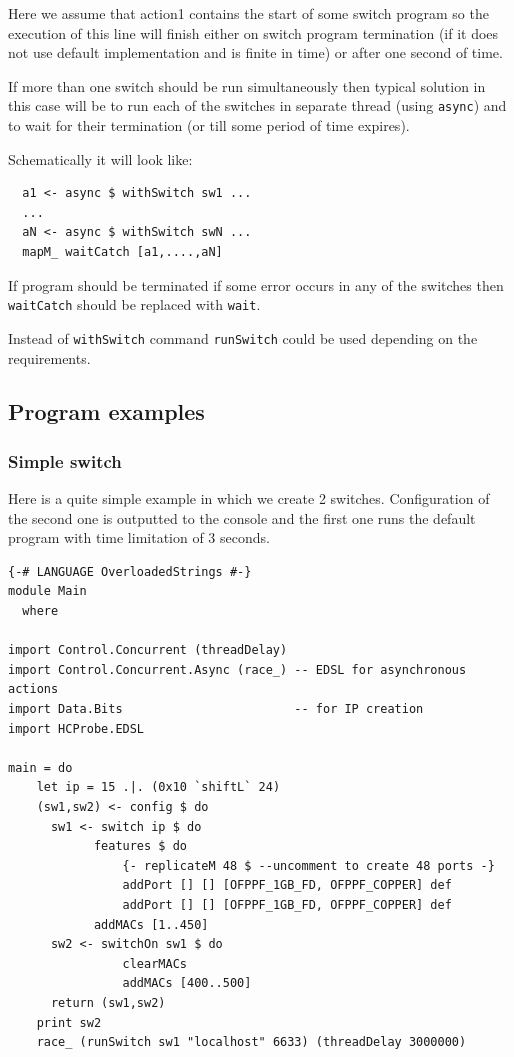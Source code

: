 \documentclass[9pt,a4paper]{article}
\begin{document}
Here we assume that action1 contains the start of some switch program so the
execution of this line will finish either on switch program
termination (if it does not use default implementation and is finite
in time) or after one second of time.

If more than one switch should be run simultaneously then typical
solution in this case will be to run each of the switches in separate
thread (using \lstinline!async!) and to wait for their termination (or
till some period of time expires).

Schematically it will look like:

\begin{lstlisting}
  a1 <- async $ withSwitch sw1 ...
  ...
  aN <- async $ withSwitch swN ...
  mapM_ waitCatch [a1,....,aN]
\end{lstlisting}

If program should be terminated if some error occurs in any of the
switches then \lstinline!waitCatch! should be replaced with
\lstinline!wait!.

Instead of \lstinline!withSwitch! command \lstinline!runSwitch! could
be used depending on the requirements.

\subsection{Program examples}

\subsubsection{Simple switch}

Here is a quite simple example in which we create 2
switches. Configuration of the second one is outputted to the console and
the first one runs the default program with time limitation of 3 seconds.

\begin{lstlisting}
{-# LANGUAGE OverloadedStrings #-}
module Main
  where

import Control.Concurrent (threadDelay)
import Control.Concurrent.Async (race_) -- EDSL for asynchronous actions
import Data.Bits                        -- for IP creation
import HCProbe.EDSL

main = do 
    let ip = 15 .|. (0x10 `shiftL` 24)
    (sw1,sw2) <- config $ do
      sw1 <- switch ip $ do
            features $ do
                {- replicateM 48 $ --uncomment to create 48 ports -}
                addPort [] [] [OFPPF_1GB_FD, OFPPF_COPPER] def
                addPort [] [] [OFPPF_1GB_FD, OFPPF_COPPER] def
            addMACs [1..450]
      sw2 <- switchOn sw1 $ do
                clearMACs 
                addMACs [400..500]
      return (sw1,sw2)
    print sw2
    race_ (runSwitch sw1 "localhost" 6633) (threadDelay 3000000)
\end{lstlisting}
\end{document}
